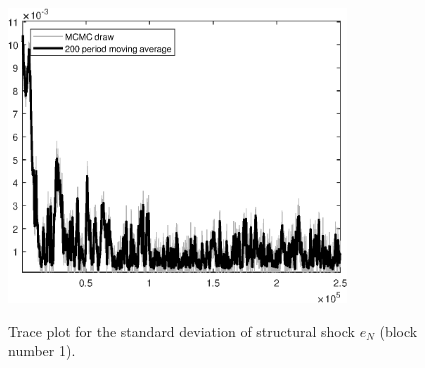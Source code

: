 \begin{figure}[H]
\centering
  \includegraphics[width=0.8\textwidth]{BRS_aggregate/graphs/TracePlot_SE_e_N_blck_1}\\
    \caption{Trace plot for the standard deviation of structural shock ${e_N}$ (block number 1).}
\end{figure}
